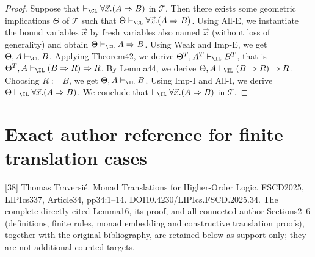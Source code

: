 \begin{proof}
Suppose that $\vdash_\CL\forall\vec x.(A\Rightarrow B)$ in $\mathcal T$. Then there exists some geometric implications $\Theta$ of $\mathcal T$ such that $\Theta\vdash_\CL\forall\vec x.(A\Rightarrow B)$. Using All-E, we instantiate the bound variables $\vec x$ by fresh variables also named $\vec x$ (without loss of generality) and obtain $\Theta\vdash_\CL A\Rightarrow B$. Using Weak and Imp-E, we get $\Theta,A\vdash_\CL B$. Applying Theorem42, we derive $\Theta^T,A^T\vdash_\IL B^T$, that is $\Theta^T,A\vdash_\IL(B\Rightarrow R)\Rightarrow R$. By Lemma44, we derive $\Theta,A\vdash_\IL(B\Rightarrow R)\Rightarrow R$. Choosing $R:=B$, we get $\Theta,A\vdash_\IL B$. Using Imp-I and All-I, we derive $\Theta\vdash_\IL\forall\vec x.(A\Rightarrow B)$. We conclude that $\vdash_\IL\forall\vec x.(A\Rightarrow B)$ in $\mathcal T$.
\end{proof}
\section*{Exact author reference for finite translation cases}
[38] Thomas Traversi\'e. Monad Translations for Higher-Order Logic. FSCD2025, LIPIcs337, Article34, pp34:1--14. DOI10.4230/LIPIcs.FSCD.2025.34. The complete directly cited Lemma16, its proof, and all connected author Sections2--6 (definitions, finite rules, monad embedding and constructive translation proofs), together with the original bibliography, are retained below as support only; they are not additional counted targets.
